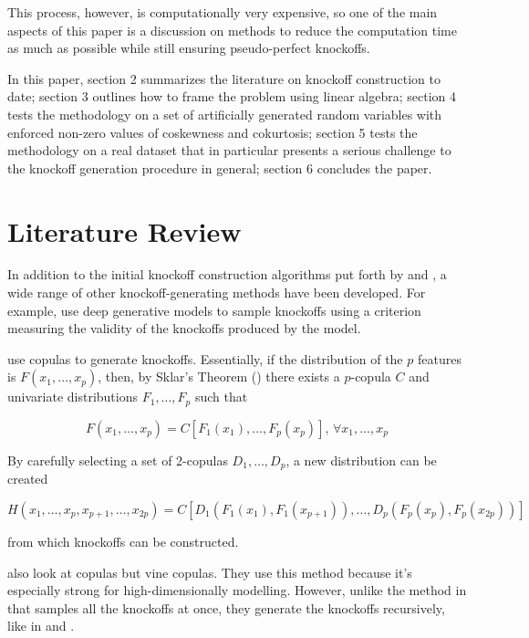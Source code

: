 \documentclass[review]{elsarticle}
\begin{document}
This process, however, is computationally very expensive, so one of the main aspects of this paper is a discussion on methods to reduce the computation time as much as possible while still ensuring pseudo-perfect knockoffs.

In this paper, section 2 summarizes the literature on knockoff construction to date; section 3 outlines how to frame the problem using linear algebra; section 4 tests the methodology on a set of artificially generated random variables with enforced non-zero values of coskewness and cokurtosis; section 5 tests the methodology on a real dataset that in particular presents a serious challenge to the knockoff generation procedure in general; section 6 concludes the paper.

\section{Literature Review}

In addition to the initial knockoff construction algorithms put forth by \citet{candes2018panning} and \cite{bates2021metropolized}, a wide range of other knockoff-generating methods have been developed. For example, \citet{romano2020deep} use deep generative models to sample knockoffs using a criterion measuring the validity of the knockoffs produced by the model.

\citet{berti2023new} use copulas to generate knockoffs. Essentially, if the distribution of the $p$ features is $F(x_1,\dots,x_p)$, then, by Sklar's Theorem (\citet{sklar1959fonctions}) there exists a $p$-copula $C$ and univariate distributions $F_1,\dots,F_p$ such that

$$F(x_1,\dots,x_p)=C\left[F_1(x_1),\dots,F_p(x_p)\right],\, \forall x_1,\dots,x_p$$

By carefully selecting a set of 2-copulas $D_1,\dots,D_p$, a new distribution can be created

$$H(x_1,\dots,x_p,x_{p+1},\dots,x_{2p})=C\left[D_1\left(F_1(x_1),F_1(x_{p+1})\right),\dots,D_p\left(F_p(x_p),F_p(x_{2p})\right)\right]$$

from which knockoffs can be constructed.

\citet{kurz2022vine} also look at copulas but vine copulas. They use this method because it's especially strong for high-dimensionally modelling. However, unlike the method in \citet{berti2023new} that samples all the knockoffs at once, they generate the knockoffs recursively, like in \citet{candes2018panning} and \cite{bates2021metropolized}.
\end{document}
